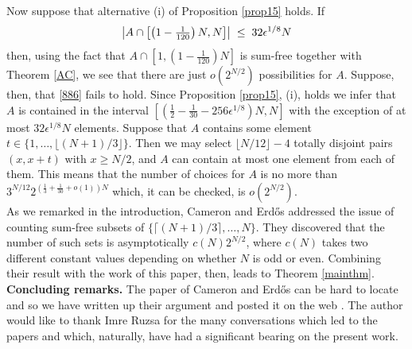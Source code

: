 \documentclass[a4paper,12pt]{article}
\begin{document}
Now suppose that alternative (i) of Proposition \ref{prop15} holds. If 
\begin{equation}\label{886} \left| A \cap \left[\left(1 - \textstyle\frac{1}{120}\displaystyle\right)N,N\right]\right| \; \leq \; 32\epsilon^{1/8}N\end{equation} then, using the fact that $A \cap [1,\left(1 - \frac{1}{120}\right)N]$ is sum-free together with Theorem \ref{AC}, we see that there are just $o(2^{N/2})$ possibilities for $A$. Suppose, then, that \eqref{886} fails to hold. Since Proposition \ref{prop15}, (i), holds we infer that $A$ is contained in the interval $[\left(\frac{1}{2} - \frac{1}{30} - 256\epsilon^{1/8}\right)N,N]$ with the exception of at most $32\epsilon^{1/8}N$ elements. Suppose that $A$ contains some element $t \in \{1,\dots,\lfloor (N+1)/3\rfloor\}$. Then we may select $\lfloor N/12\rfloor - 4$ totally disjoint pairs $(x,x+t)$ with $x \geq N/2$, and $A$ can contain at most one element from each of them. This means that the number of choices for $A$ is no more than $3^{N/12}2^{\left(\frac{1}{3} + \frac{1}{30} + o(1)\right)N}$ which, it can be checked, is $o(2^{N/2})$.\endproof\\[11pt]
As we remarked in the introduction, Cameron and Erd\H{o}s \cite{CE1} addressed the issue of counting sum-free subsets of $\{\lceil (N+1)/3\rceil,\dots,N\}$. They discovered that the number of such sets is asymptotically $c(N)2^{N/2}$, where $c(N)$ takes two different constant values depending on whether $N$ is odd or even. Combining their result with the work of this paper, then, leads to Theorem \ref{mainthm}.\endproof\\[11pt]
\noindent\textbf{Concluding remarks.} The paper \cite{CE1} of Cameron and Erd\H{o}s can be hard to locate and so we have written up their argument and posted it on the web \cite{GreenWeb}. The author would like to thank Imre Ruzsa for the many conversations which led to the papers \cite{GreenRuz1,GreenRuz2} and which, naturally, have had a significant bearing on the present work.
\end{document}
